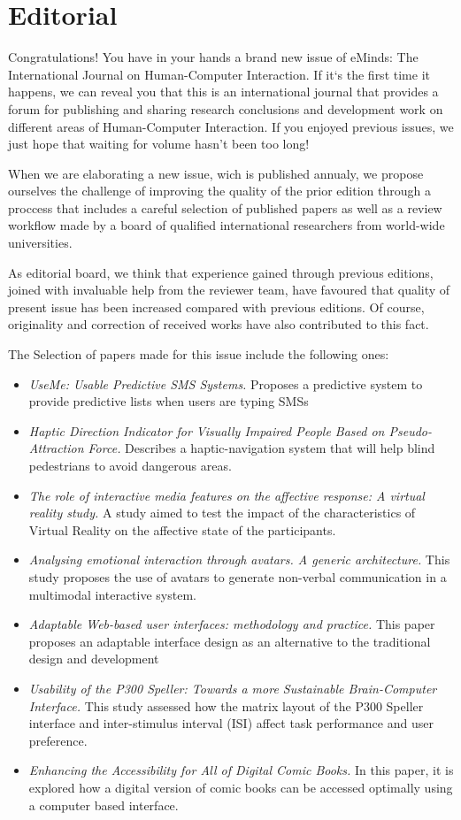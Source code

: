 \chapter*{Editorial}

Congratulations! You have in your hands a brand new issue of eMinds: The International Journal on Human-Computer Interaction. If it`s the first time it happens, we can reveal you that this is an international journal that provides a forum for publishing and sharing  research conclusions and development work on different areas of Human-Computer Interaction. If you enjoyed previous issues, we just hope that waiting for volume hasn't been too long!

When we are elaborating a new issue, wich is published annualy, we propose ourselves the challenge of improving the quality of the prior edition through a  proccess that includes a careful selection of published papers as well as a review  workflow made by a board of qualified international researchers from world-wide universities.

As editorial board, we think that experience gained through previous editions, joined with invaluable help from the reviewer team, have favoured that quality of present issue has been increased compared with previous editions. Of course, originality and correction of received works have also contributed to this fact.

The Selection of papers made for this issue include the following ones:
 \begin{itemize}
    \item \emph{UseMe: Usable Predictive SMS Systems.} Proposes a predictive system to provide predictive lists when users are typing SMSs
    \item \emph{Haptic Direction Indicator for Visually Impaired People Based on Pseudo-Attraction Force.} Describes a haptic-navigation system that will help blind pedestrians to avoid dangerous areas.
    \item \emph{The role of interactive media features on the affective response: A virtual reality study.} A study aimed to test the impact of the characteristics of Virtual Reality on the affective state of the participants.
    \item \emph{Analysing emotional interaction through avatars. A generic architecture.} This study proposes the use of avatars to generate non-verbal communication in a multimodal interactive system.
    \item \emph{Adaptable Web-based user interfaces: methodology and practice.} This paper proposes an adaptable interface design as an alternative to the traditional design and development
    \item \emph{Usability of the P300 Speller: Towards a more Sustainable Brain-Computer Interface.} This study assessed how the matrix layout of the P300 Speller interface and inter-stimulus interval (ISI) affect task performance and user preference.
    \item  \emph{Enhancing the Accessibility for All of Digital Comic Books.} In this paper, it is explored how a digital version of comic books can be accessed optimally using a computer based interface.
 \end{itemize}

